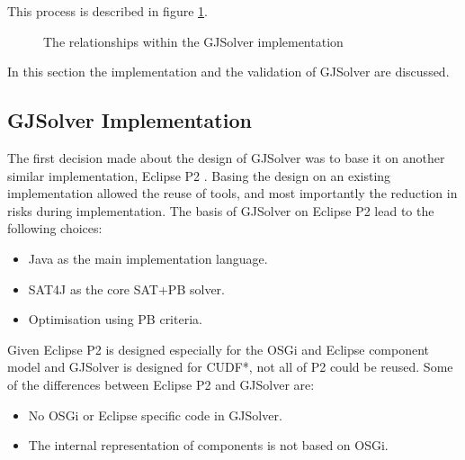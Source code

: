 This process is described in figure \ref{impl.modelofgjsolver}.
\begin{figure}[htp]
\begin{center}
  \caption{The relationships within the GJSolver implementation}
  \label{impl.modelofgjsolver}
\end{center}
\end{figure}

In this section the implementation and the validation of GJSolver are discussed.

\subsection{GJSolver Implementation}
\label{impl.gjsolverimpl}
The first decision made about the design of GJSolver was to base it on another similar implementation, Eclipse P2 \citep{le_berre_dependency_2009,leBerre2010}.
Basing the design on an existing implementation allowed the reuse of tools, and most importantly the reduction in risks during implementation.
The basis of GJSolver on Eclipse P2 lead to the following choices:
\begin{itemize}
  \item Java as the main implementation language.
  \item SAT4J as the core SAT+PB solver.
  \item Optimisation using PB criteria.
\end{itemize}

Given Eclipse P2 is designed especially for the OSGi and Eclipse component model and GJSolver is designed for CUDF*, not all of P2 could be reused.
Some of the differences between Eclipse P2 and GJSolver are:
\begin{itemize}
  \item No OSGi or Eclipse specific code in GJSolver.
  \item The internal representation of components is not based on OSGi.
\end{itemize}

